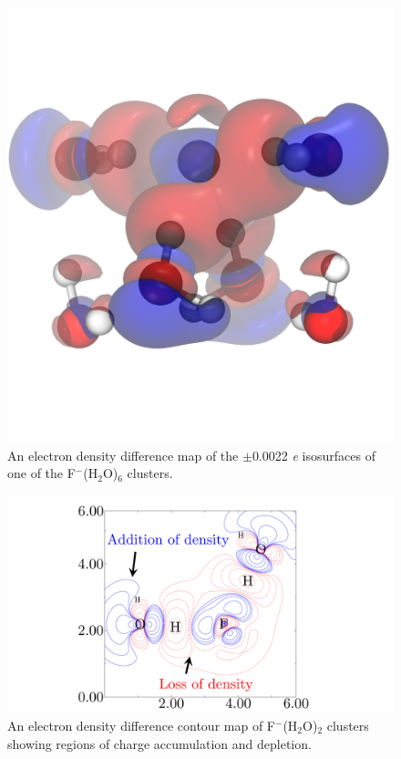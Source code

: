 \begin{sie}
\begin{figure}
 \begin{center}
  \includegraphics[width=0.98\linewidth]{images/ct_main/f-6-r4aa.png}
 \end{center}
 \caption[Electron density difference map in F$^{-}$(H$_{2}$O)$_{6}$]{\label{fig:f-6-r4aa-delrho}An electron density difference map of the $\pm$0.0022 \emph{e}
 isosurfaces of one of the F$^{-}$(H$_{2}$O)$_{6}$ clusters.}
\end{figure}

\begin{figure}
 \begin{center}
  \includegraphics[width=0.98\linewidth]{images/ct_main/f-2-deltarho-Hb1XHb2.jpg}
 \end{center}
 \caption[Electron density difference contours in F$^{-}$(H$_{2}$O)$_{2}$]{\label{fig:f-2-contour}An electron density difference contour map of 
 F$^{-}$(H$_{2}$O)$_{2}$ clusters showing regions of charge accumulation and depletion.}
\end{figure}


\end{sie}
